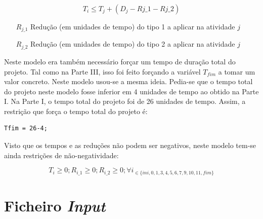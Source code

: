 \begin{displaymath}
T_{i} \leq T_{j} + (D_{j} - R{j\_1} - R{j\_2})
\end{displaymath}

\begin{itemize}
	\item[$R_{j\_1}$] Redução (em unidades de tempo) do tipo 1 a aplicar na atividade $j$
	\item[$R_{j\_2}$] Redução (em unidades de tempo) do tipo 2 a aplicar na atividade $j$
\end{itemize}

Neste modelo era também necessário forçar um tempo de duração total do projeto. Tal como na Parte III, isso foi feito forçando a variável $T_{fim}$ a tomar um valor concreto. Neste modelo usou-se a mesma ideia. Pedia-se que o tempo total do projeto neste modelo fosse inferior em 4 unidades de tempo ao obtido na Parte I. Na Parte I, o tempo total do projeto foi de 26 unidades de tempo. Assim, a restrição que força o tempo total do projeto é:

\begin{verbatim}
Tfim = 26-4;
\end{verbatim}

Visto que os tempos e as reduções não podem ser negativos, neste modelo tem-se ainda restrições de não-negatividade:

\begin{displaymath}
T_{i} \geq 0;  R_{i\_1} \geq 0; R_{i\_2} \geq 0; \forall i_{\in\{ini, 0, 1, 3, 4,5,6,7,9,10,11,fim\}}
\end{displaymath}


\section{Ficheiro \emph{Input}}
\label{p5:sec:fichin}

